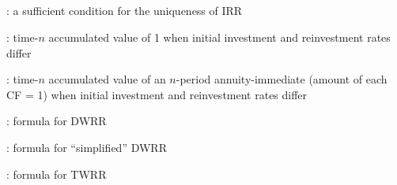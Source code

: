 \subsection*{}
\item {}: a sufficient condition for the uniqueness of IRR
\item {}: time-\(n\) accumulated value of 1 when initial investment and reinvestment rates differ
\item {}: time-\(n\) accumulated value
of an \(n\)-period annuity-immediate (amount of each CF = 1) when initial
investment and reinvestment rates differ
\item {}: formula for DWRR
\item {}: formula for ``simplified'' DWRR
\item {}: formula for TWRR

